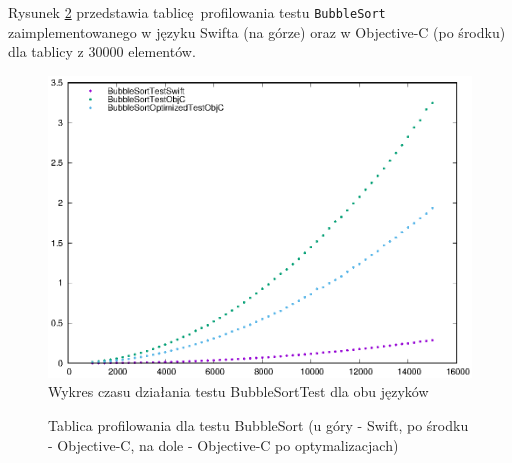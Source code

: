 \documentclass[mgr, shortabstract]{iithesis}
\begin{document}
Rysunek \ref{i:bubble_sort} przedstawia tablicę profilowania testu \texttt{BubbleSort} zaimplementowanego w języku Swifta (na górze) oraz w Objective-C (po środku) dla tablicy z 30000 elementów.

\begin{figure}
    \includegraphics{plots/BubbleSort.eps}
    \caption{Wykres czasu działania testu BubbleSortTest dla obu języków}
    \label{p:bubble_sort}
\end{figure}

\begin{figure}
    \caption{Tablica profilowania dla testu BubbleSort (u góry - Swift, po środku - Objective-C, na dole - Objective-C po optymalizacjach)}
    \label{i:bubble_sort}
\end{figure}
\end{document}
